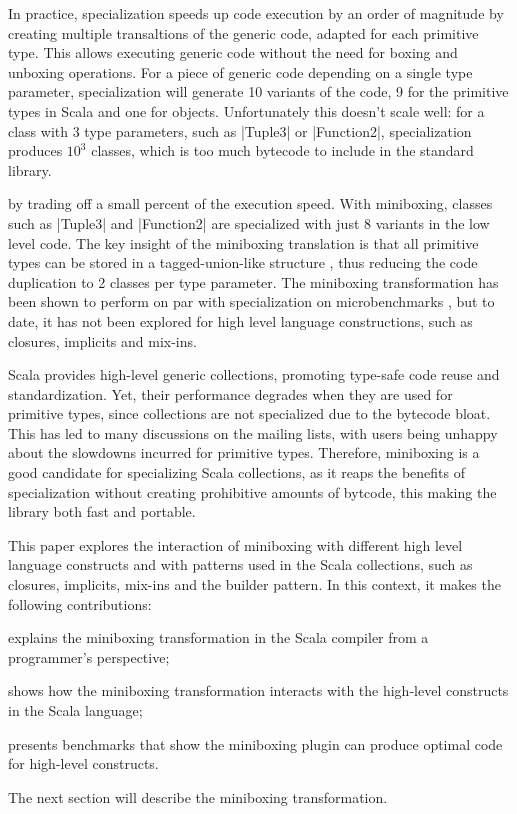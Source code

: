  In practice, specialization speeds up code execution by an order of magnitude \cite{erik-spire} by creating multiple transaltions of the generic code, adapted for each primitive type. This allows executing generic code without the need for boxing and unboxing operations. For a piece of generic code depending on a single type parameter, specialization will generate 10 variants of the code, 9 for the primitive types in Scala and one for objects. Unfortunately this doesn't scale well: for a class with 3 type parameters, such as |Tuple3| or |Function2|, specialization produces $10^3$ classes, which is too much bytecode to include in the standard library.

 by trading off a small percent of the execution speed. With miniboxing, classes such as |Tuple3| and |Function2| are specialized with just 8 variants in the low level code. The key insight of the miniboxing translation is that all primitive types can be stored in a tagged-union-like structure \cite{tagged-unions-lua}, thus reducing the code duplication to 2 classes per type parameter. The miniboxing transformation has been shown to perform on par with specialization on microbenchmarks \cite{miniboxing}, but to date, it has not been explored for high level language constructions, such as closures, implicits and mix-ins.

Scala provides high-level generic collections, promoting type-safe code reuse and standardization. Yet, their performance degrades when they are used for primitive types, since collections are not specialized due to the bytecode bloat. This has led to many discussions on the mailing lists, with users being unhappy about the slowdowns incurred for primitive types. Therefore, miniboxing is a good candidate for specializing Scala collections, as it reaps the benefits of specialization without creating prohibitive amounts of bytcode, this making the library both fast and portable.

This paper explores the interaction of miniboxing with different high level language constructs and with patterns used in the Scala collections, such as closures, implicits, mix-ins and the builder pattern. In this context, it makes the following contributions:

\begin{packed_item}
\item explains the miniboxing transformation in the Scala compiler from a programmer's perspective;
\item shows how the miniboxing transformation interacts with the high-level constructs in the Scala language;
\item presents benchmarks that show the miniboxing plugin can produce optimal code for high-level constructs.
\end{packed_item}

The next section will describe the miniboxing transformation.